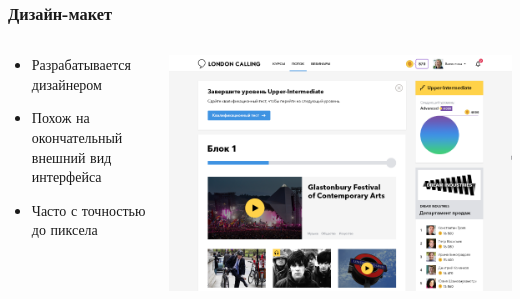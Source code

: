 \documentclass[xetex,mathserif,serif]{beamer}
\begin{document}
		\begin{frame}
			\frametitle{Дизайн-макет}
			\begin{columns}
				\begin{column}{0.4\textwidth}
					\begin{itemize}
						\item Разрабатывается дизайнером
						\item Похож на окончательный внешний вид интерфейса
						\item Часто с точностью до пиксела
					\end{itemize}
				\end{column}
				\begin{column}{0.6\textwidth}
					\begin{center}
						\includegraphics[width=\textwidth]{mockup.png}
					\end{center}
				\end{column}
			\end{columns}
		\end{frame}
	
\end{document}

